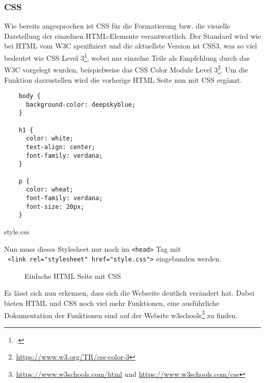 \subsubsection{CSS}
Wie bereits angesprochen ist \ac*{CSS} für die Formatierung bzw. die visuelle
Darstellung der einzelnen HTML-Elemente verantwortlich. Der Standard wird wie
bei HTML vom \acs*{W3C} spezifiziert und die aktuellste Version ist CSS3, was so
viel bedeutet wie \acs*{CSS} Level 3\footcite[]{w3ccss}, wobei nur einzelne Teile als Empfehlung
durch das \acs*{W3C} vorgelegt wurden, beispielweise das CSS Color Module Level
3\footnote{\url{https://www.w3.org/TR/css-color-3}}. Um die Funktion
darzustellen wird die vorherige HTML Seite nun mit CSS ergänzt.

\begin{listing}[H]
  \begin{verbatim}
    body {
      background-color: deepskyblue;
    }

    h1 {
      color: white;
      text-align: center;
      font-family: verdana;
    }

    p {
      color: wheat;
      font-family: verdana;
      font-size: 20px;
    }
  \end{verbatim}
  \caption{style.css}
\end{listing}

Nun muss dieses Stylesheet nur noch im \verb|<head>| Tag mit\\
\texttt{  <link rel="stylesheet" href="style.css">} eingebunden werden.

\begin{figure}[H]
  \centering
  \caption{Einfache HTML Seite mit CSS}
\end{figure}

Es lässt sich nun erkennen, dass sich die Webseite deutlich verändert hat. Dabei
bieten HTML und CSS noch viel mehr Funktionen, eine ausführliche
Dokumentation der Funktionen sind auf der Website
w3schools\footnote{\url{https://www.w3schools.com/html} und
\url{https://www.w3schools.com/css}} zu finden.

